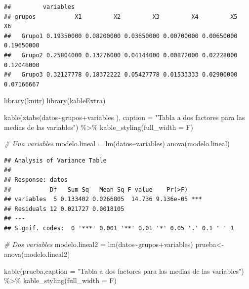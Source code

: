 \documentclass{staprojteamusb}
\newenvironment{Shaded}{\begin{snugshade}}{\end{snugshade}}
\newcommand{\AttributeTok}[1]{\textcolor[rgb]{0.77,0.63,0.00}{#1}}
\newcommand{\CommentTok}[1]{\textcolor[rgb]{0.56,0.35,0.01}{\textit{#1}}}
\newcommand{\FunctionTok}[1]{\textcolor[rgb]{0.00,0.00,0.00}{#1}}
\newcommand{\NormalTok}[1]{#1}
\newcommand{\OtherTok}[1]{\textcolor[rgb]{0.56,0.35,0.01}{#1}}
\newcommand{\SpecialCharTok}[1]{\textcolor[rgb]{0.00,0.00,0.00}{#1}}
\newcommand{\StringTok}[1]{\textcolor[rgb]{0.31,0.60,0.02}{#1}}
\begin{document}
\begin{verbatim}
##         variables
## grupos           X1         X2         X3         X4         X5         X6
##   Grupo1 0.19350000 0.08200000 0.03650000 0.00700000 0.00650000 0.19650000
##   Grupo2 0.25804000 0.13276000 0.04144000 0.00872000 0.02228000 0.12048000
##   Grupo3 0.32127778 0.18372222 0.05427778 0.01533333 0.02900000 0.07166667
\end{verbatim}

\begin{Shaded}
\begin{Highlighting}[]
\FunctionTok{library}\NormalTok{(knitr)}
\FunctionTok{library}\NormalTok{(kableExtra)}

\FunctionTok{kable}\NormalTok{(}\FunctionTok{xtabs}\NormalTok{(datos}\SpecialCharTok{\textasciitilde{}}\NormalTok{grupos}\SpecialCharTok{+}\NormalTok{variables ),}
      \AttributeTok{caption =} \StringTok{"Tabla a dos factores para las medias de las variables"}\NormalTok{) }\SpecialCharTok{\%\textgreater{}\%}
  \FunctionTok{kable\_styling}\NormalTok{(}\AttributeTok{full\_width =}\NormalTok{ F)}
\end{Highlighting}
\end{Shaded}

\begin{Shaded}
\begin{Highlighting}[]
\CommentTok{\# Una variables }
\NormalTok{modelo.lineal }\OtherTok{=} \FunctionTok{lm}\NormalTok{(datos}\SpecialCharTok{\textasciitilde{}}\NormalTok{variables)}
\FunctionTok{anova}\NormalTok{(modelo.lineal)}
\end{Highlighting}
\end{Shaded}

\begin{verbatim}
## Analysis of Variance Table
## 
## Response: datos
##           Df   Sum Sq   Mean Sq F value    Pr(>F)    
## variables  5 0.133402 0.0266805  14.736 9.136e-05 ***
## Residuals 12 0.021727 0.0018105                      
## ---
## Signif. codes:  0 '***' 0.001 '**' 0.01 '*' 0.05 '.' 0.1 ' ' 1
\end{verbatim}

\begin{Shaded}
\begin{Highlighting}[]
\CommentTok{\# Dos variables}
\NormalTok{modelo.lineal2 }\OtherTok{=} \FunctionTok{lm}\NormalTok{(datos}\SpecialCharTok{\textasciitilde{}}\NormalTok{grupos}\SpecialCharTok{+}\NormalTok{variables)}
\NormalTok{prueba}\OtherTok{\textless{}{-}}\FunctionTok{anova}\NormalTok{(modelo.lineal2)}
\end{Highlighting}
\end{Shaded}

\begin{Shaded}
\begin{Highlighting}[]
\FunctionTok{kable}\NormalTok{(prueba,}\AttributeTok{caption =} \StringTok{"Tabla a dos factores para las medias de las variables"}\NormalTok{) }\SpecialCharTok{\%\textgreater{}\%}
  \FunctionTok{kable\_styling}\NormalTok{(}\AttributeTok{full\_width =}\NormalTok{ F)}
\end{Highlighting}
\end{Shaded}

	
\end{document}
